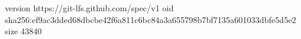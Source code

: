version https://git-lfs.github.com/spec/v1
oid sha256:ef9ac3dded68dbcbe42f6a811c6bc84a3a655798b7bf7135a601033dbfe5d5e2
size 43840
